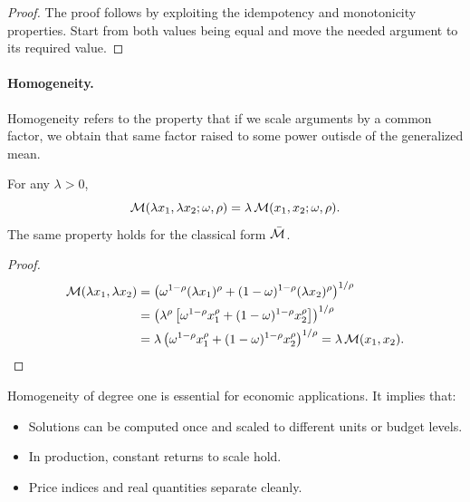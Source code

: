 \begin{proof}
The proof follows by exploiting the idempotency and monotonicity properties. Start from both values being equal and move the needed argument to its required value. 
\end{proof}

\paragraph{Homogeneity.}
Homogeneity refers to the property that if we scale arguments by a common factor, we obtain that same factor raised to some power outisde of the generalized mean. 
\begin{proposition}
\label{prop:homogeneity}
For any $\lambda > 0$,
\begin{equation}
\label{eq:homogeneity}
\mathcal{M}(\lambda x_1, \lambda x_2; \omega, \rho) = \lambda \, \mathcal{M}(x_1, x_2; \omega, \rho).
\end{equation}
The same property holds for the classical form $\bar{\mathcal{M}}$.
\end{proposition}

\begin{proof}
\begin{align*}
\mathcal{M}(\lambda x_1, \lambda x_2) 
&= \left( \omega^{1-\rho} (\lambda x_1)^\rho + (1-\omega)^{1-\rho} (\lambda x_2)^\rho \right)^{1/\rho} \\
&= \left( \lambda^\rho \left[ \omega^{1-\rho} x_1^\rho + (1-\omega)^{1-\rho} x_2^\rho \right] \right)^{1/\rho} \\
&= \lambda \left( \omega^{1-\rho} x_1^\rho + (1-\omega)^{1-\rho} x_2^\rho \right)^{1/\rho} 
= \lambda \, \mathcal{M}(x_1, x_2).
\end{align*}
\end{proof}

\begin{calloutimportant}
Homogeneity of degree one is essential for economic applications. It implies that:
\begin{itemize}[leftmargin=1.5em]
    \item Solutions can be computed once and scaled to different units or budget levels.
    \item In production, constant returns to scale hold.
    \item Price indices and real quantities separate cleanly.
\end{itemize}
\end{calloutimportant}

